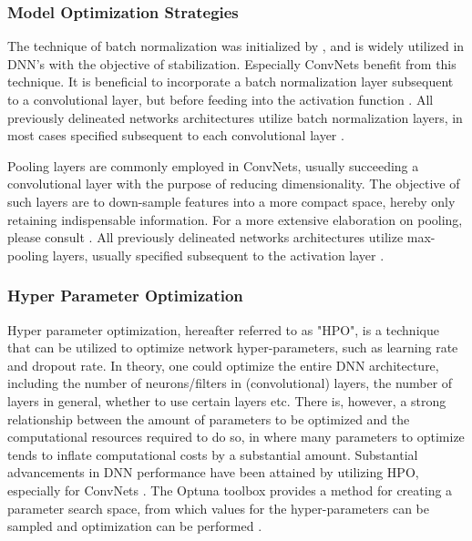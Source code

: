 \documentclass[12pt]{article}
\begin{document}
\subsubsection{Model Optimization Strategies}
The technique of batch normalization was initialized by , and is widely utilized in DNN's with the objective of stabilization. Especially ConvNets benefit from this technique. It is beneficial to incorporate a batch normalization layer subsequent to a convolutional layer, but before feeding into the activation function \cite{ioffe2015batch}.  All previously delineated networks architectures utilize batch normalization layers, in most cases specified subsequent to each convolutional layer \cite{dolmans2020perceived} \cite{tabar2016novel} \cite{schirrmeister2017deep} \cite{biswas2019cornet} \cite{sun2019hybrid}.

Pooling layers are commonly employed in ConvNets, usually succeeding a convolutional layer with the purpose of reducing dimensionality. The objective of such layers are to down-sample features into a more compact space, hereby only retaining indispensable information. For a more extensive elaboration on pooling, please consult . All previously delineated networks architectures utilize max-pooling layers, usually specified subsequent to the activation layer \cite{dolmans2020perceived} \cite{tabar2016novel} \cite{schirrmeister2017deep} \cite{biswas2019cornet} \cite{sun2019hybrid}.

\subsubsection{Hyper Parameter Optimization}
Hyper parameter optimization, hereafter referred to as "HPO", is a technique that can be utilized to optimize network hyper-parameters, such as learning rate and dropout rate.  In theory, one could optimize the entire DNN architecture, including the number of neurons/filters in (convolutional) layers, the number of layers in general, whether to use certain layers etc. There is, however, a strong relationship between the amount of parameters to be optimized and the computational resources required to do so, in where many parameters to optimize tends to inflate computational costs by a substantial amount. Substantial advancements in DNN performance have been attained by utilizing HPO, especially for ConvNets \cite{bergstra2012random}. The Optuna toolbox provides a method for creating a parameter search space, from which values for the hyper-parameters can be sampled and optimization can be performed \cite{akiba2019optuna}. 
\bigskip 
\end{document}
